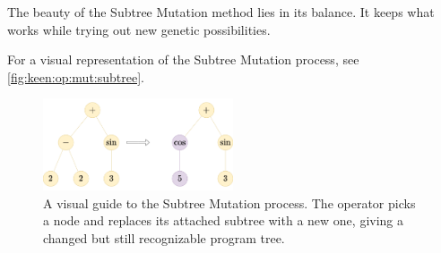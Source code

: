   The beauty of the Subtree Mutation method lies in its balance. It keeps what 
  works while trying out new genetic possibilities.

  For a visual representation of the Subtree Mutation process, see 
  \vref{fig:keen:op:mut:subtree}.

  \begin{figure}[ht!]
    \centering
    \includegraphics[width=0.5\textwidth]{img/keen/STM.png}
    \caption{
      A visual guide to the Subtree Mutation process. The operator picks a node 
      and replaces its attached subtree with a new one, giving a changed but 
      still recognizable program tree.
    }
    \label{fig:keen:op:mut:subtree}
  \end{figure}
